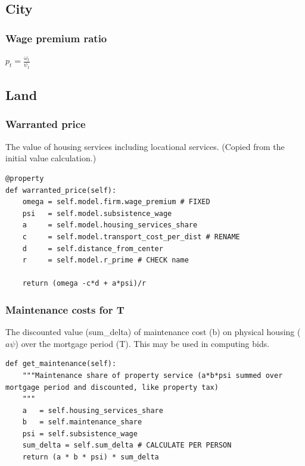 \subsection{City}
\subsubsection{Wage premium ratio}

$p_t= \frac{\omega_t}{\psi_t}$ 


    \subsection{Land}
\subsubsection{Warranted price} The value of housing services including locational services. (Copied from the initial value calculation.)
\begin{lstlisting}
@property
def warranted_price(self):
    omega = self.model.firm.wage_premium # FIXED
    psi   = self.model.subsistence_wage
    a     = self.model.housing_services_share
    c     = self.model.transport_cost_per_dist # RENAME
    d     = self.distance_from_center
    r     = self.model.r_prime # CHECK name
  
    return (omega -c*d + a*psi)/r
\end{lstlisting}

\subsubsection{Maintenance costs for T} The discounted value (sum\_delta) of maintenance cost (b) on  physical housing ($a\psi$) over the mortgage period (T). This may be used in computing bids.

\begin{lstlisting}
def get_maintenance(self):
    """Maintenance share of property service (a*b*psi summed over mortgage period and discounted, like property tax)
    """
    a   = self.housing_services_share
    b   = self.maintenance_share
    psi = self.subsistence_wage
    sum_delta = self.sum_delta # CALCULATE PER PERSON
    return (a * b * psi) * sum_delta  
\end{lstlisting}

